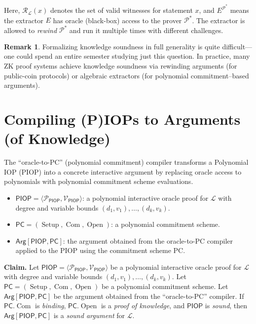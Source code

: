 \documentclass[11pt]{article}
\theoremstyle{plain}
\theoremstyle{definition}
\newtheorem{remark}[theorem]{Remark}
\DeclareMathOperator{\Setup}{Setup}
\DeclareMathOperator{\Com}{Com}
\DeclareMathOperator{\Open}{Open}
\begin{document}
\medskip
Here, $\mathcal{R}_\mathcal{L}(x)$ denotes the set of valid witnesses for statement $x$,
and $E^{\mathcal{P}^*}$ means the extractor $E$ has oracle (black-box) access to the
prover $\mathcal{P}^*$.  The extractor is allowed to \emph{rewind} $\mathcal{P}^*$ and
run it multiple times with different challenges.

\begin{remark}
  Formalizing knowledge soundness in full generality is quite difficult---one could
  spend an entire semester studying just this question.  In practice, many ZK proof
  systems achieve knowledge soundness via rewinding arguments (for public-coin protocols)
  or algebraic extractors (for polynomial commitment--based arguments).
\end{remark}

\section{Compiling (P)IOPs to Arguments (of Knowledge)}

The ``oracle-to-PC'' (polynomial commitment) compiler transforms a Polynomial IOP (PIOP)
into a concrete interactive argument by replacing oracle access to polynomials with
polynomial commitment scheme evaluations.

\begin{tcolorbox}[colback=gray!5, colframe=gray!50, title=Setup]
  \begin{itemize}
    \item $\mathsf{PIOP} = \langle \mathcal{P}_{\mathsf{PIOP}}, \mathcal{V}_{\mathsf{PIOP}} \rangle$:
      a polynomial interactive oracle proof for $\mathcal{L}$ with degree and variable
      bounds $(d_1, v_1), \ldots, (d_k, v_k)$.
    \item $\mathsf{PC} = (\Setup, \Com, \Open)$: a polynomial commitment scheme.
    \item $\mathsf{Arg}[\mathsf{PIOP}, \mathsf{PC}]$: the argument obtained from the
      oracle-to-PC compiler applied to the PIOP using the commitment scheme PC.
  \end{itemize}
\end{tcolorbox}

\begin{claimbox}
  \textbf{Claim.}  Let $\mathsf{PIOP} = \langle \mathcal{P}_{\mathsf{PIOP}},
  \mathcal{V}_{\mathsf{PIOP}} \rangle$ be a polynomial interactive oracle proof for
  $\mathcal{L}$ with degree and variable bounds $(d_1, v_1), \ldots, (d_k, v_k)$.  Let
  $\mathsf{PC} = (\Setup, \Com, \Open)$ be a polynomial commitment scheme.  Let
  $\mathsf{Arg}[\mathsf{PIOP}, \mathsf{PC}]$ be the argument obtained from the
  ``oracle-to-PC'' compiler.  If $\mathsf{PC}.\Com$ is \emph{binding}, $\mathsf{PC}.\Open$
  is a \emph{proof of knowledge}, and $\mathsf{PIOP}$ is \emph{sound}, then
  $\mathsf{Arg}[\mathsf{PIOP}, \mathsf{PC}]$ is a \emph{sound argument} for $\mathcal{L}$.
\end{claimbox}
\end{document}
